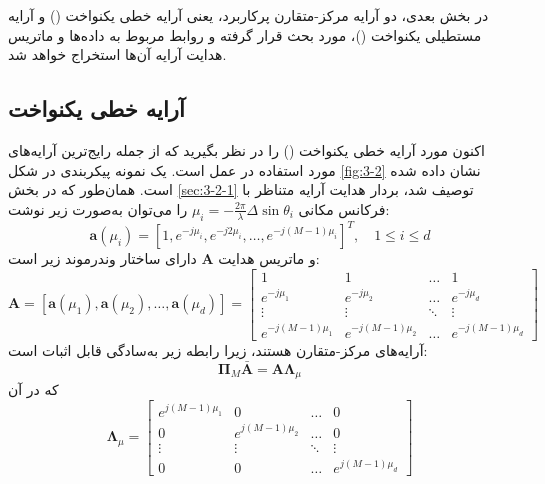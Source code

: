در بخش بعدی، دو آرایه مرکز-متقارن پرکاربرد، یعنی آرایه خطی یکنواخت () و آرایه مستطیلی یکنواخت ()، مورد بحث قرار گرفته و روابط مربوط به داده‌ها و ماتریس هدایت آرایه آن‌ها استخراج خواهد شد.



\subsection{آرایه خطی یکنواخت}
\label{subsec:3-3-1}

اکنون مورد آرایه خطی یکنواخت () را در نظر بگیرید که از جمله رایج‌ترین آرایه‌های مورد استفاده در عمل است. یک نمونه پیکربندی در شکل \ref{fig:3-2} نشان داده شده است. همان‌طور که در بخش \ref{sec:3-2-1} توصیف شد، بردار هدایت آرایه متناظر با فرکانس مکانی $\mu_i = - \frac{2\pi}{\lambda} \Delta \sin \theta_i$ را می‌توان به‌صورت زیر نوشت:
\begin{equation}
	\bm{a}(\mu_i) = [1, e^{-j\mu_i}, e^{-j2\mu_i}, \dots, e^{-j(M-1)\mu_i}]^T, \quad 1 \leq i \leq d
	\label{eq:3-20}
\end{equation}
و ماتریس هدایت $\bm{A}$ دارای ساختار وندرموند زیر است:
\begin{equation}
	\bm{A} = [\bm{a}(\mu_1), \bm{a}(\mu_2), \dots, \bm{a}(\mu_d)] = 
	\begin{bmatrix} 
		1 & 1 & \dots & 1 \\
		e^{-j\mu_1} & e^{-j\mu_2} & \dots & e^{-j\mu_d} \\
		\vdots & \vdots & \ddots & \vdots \\
		e^{-j(M-1)\mu_1} & e^{-j(M-1)\mu_2} & \dots & e^{-j(M-1)\mu_d}
	\end{bmatrix}
	\label{eq:3-21}
\end{equation}
آرایه‌های  مرکز-متقارن هستند، زیرا رابطه زیر به‌سادگی قابل اثبات است:
\begin{equation}
	\bm{\Pi}_M \bar{\bm{A}} = \bm{A} \bm{\Lambda}_\mu
	\label{eq:3-22}
\end{equation}
که در آن
\begin{equation}
	\bm{\Lambda}_\mu = 
	\begin{bmatrix} 
		e^{j(M-1)\mu_1} & 0 & \dots & 0 \\
		0 & e^{j(M-1)\mu_2} & \dots & 0 \\
		\vdots & \vdots & \ddots & \vdots \\
		0 & 0 & \dots & e^{j(M-1)\mu_d}
	\end{bmatrix}
	\nonumber
\end{equation}


